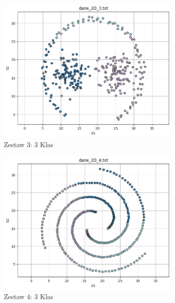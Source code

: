 \documentclass[polish,12pt,a4paper]{extarticle}
\begin{document}
\begin{figure}[h!]
    \hfill
    \begin{subfigure}[b]{0.30\textwidth}
        \includegraphics[width=\linewidth]{img/kmeans2D/data3.png}
        \captionsetup{labelformat=empty}
        \caption{Zestaw 3: 3 Klas}
    \end{subfigure}
    \hfill
    \begin{subfigure}[b]{0.30\textwidth}
        \includegraphics[width=\linewidth]{img/kmeans2D/data4.png}
        \captionsetup{labelformat=empty}
        \caption{Zestaw 4: 3 Klas}
    \end{subfigure}
    \hfill
    \begin{subfigure}[b]{0.30\textwidth}

\end{subfigure}
\end{figure}
\end{document}
